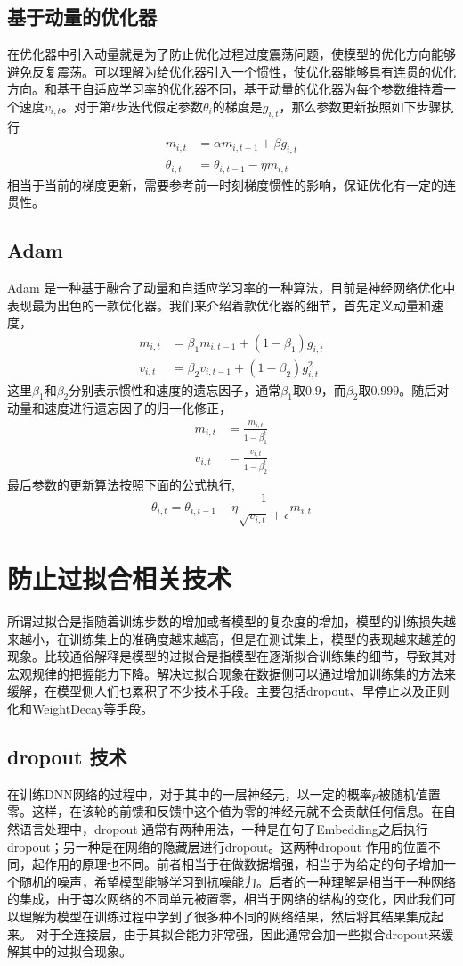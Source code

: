 \documentclass[twoside,a4paper,12pt]{book}%
\begin{document}
\subsection{基于动量的优化器}
在优化器中引入动量就是为了防止优化过程过度震荡问题，使模型的优化方向能够避免反复震荡。可以理解为给优化器引入一个惯性，使优化器能够具有连贯的优化方向。和基于自适应学习率的优化器不同，基于动量的优化器为每个参数维持着一个速度$v_{i,t}$。对于第$t$步迭代假定参数$\theta_i$的梯度是$g_{i,t}$，那么参数更新按照如下步骤执行
$$
\begin{aligned}
m_{i,t}&=\alpha m_{i,t-1} + \beta g_{i,t} \\
\theta_{i,t} &= \theta_{i,t-1} - \eta m_{i,t}
\end{aligned}
$$
相当于当前的梯度更新，需要参考前一时刻梯度惯性的影响，保证优化有一定的连贯性。
\subsection{Adam}
Adam 是一种基于融合了动量和自适应学习率的一种算法，目前是神经网络优化中表现最为出色的一款优化器。我们来介绍着款优化器的细节，首先定义动量和速度，
$$
\begin{aligned}
m_{i,t}&=\beta_1 m_{i,t-1} +(1-\beta_1)g_{i,t} \\
v_{i,t}&=\beta_2 v_{i,t-1} +(1-\beta_2)g_{i,t}^2
\end{aligned}
$$
这里$\beta_1$和$\beta_2$分别表示惯性和速度的遗忘因子，通常$\beta_1$取$0.9$，而$\beta_2$取$0.999$。随后对动量和速度进行遗忘因子的归一化修正，
$$
\begin{aligned}
m_{i,t}&=\frac{m_{i,t}}{1-\beta_1^t} \\
v_{i,t}&=\frac{v_{i,t}}{1-\beta_2^t}
\end{aligned}
$$
最后参数的更新算法按照下面的公式执行,
$$
\theta_{i,t}  =\theta_{i,t-1} -\eta \frac{1}{\sqrt{v_{i,t}}+\epsilon  } m_{i,t} 
$$
\section{防止过拟合相关技术}
所谓过拟合是指随着训练步数的增加或者模型的复杂度的增加，模型的训练损失越来越小，在训练集上的准确度越来越高，但是在测试集上，模型的表现越来越差的现象。比较通俗解释是模型的过拟合是指模型在逐渐拟合训练集的细节，导致其对宏观规律的把握能力下降。解决过拟合现象在数据侧可以通过增加训练集的方法来缓解，在模型侧人们也累积了不少技术手段。主要包括dropout、早停止以及正则化和WeightDecay等手段。
\subsection{dropout 技术}
在训练DNN网络的过程中，对于其中的一层神经元，以一定的概率$p$被随机值置零。这样，在该轮的前馈和反馈中这个值为零的神经元就不会贡献任何信息。在自然语言处理中，dropout 通常有两种用法，一种是在句子Embedding之后执行dropout；另一种是在网络的隐藏层进行dropout。这两种dropout 作用的位置不同，起作用的原理也不同。前者相当于在做数据增强，相当于为给定的句子增加一个随机的噪声，希望模型能够学习到抗噪能力。后者的一种理解是相当于一种网络的集成，由于每次网络的不同单元被置零，相当于网络的结构的变化，因此我们可以理解为模型在训练过程中学到了很多种不同的网络结果，然后将其结果集成起来。
对于全连接层，由于其拟合能力非常强，因此通常会加一些拟合dropout来缓解其中的过拟合现象。
\end{document}
